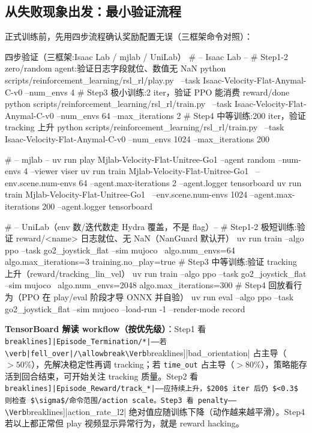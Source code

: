 \subsection{从失败现象出发：最小验证流程}
\label{sec:rlmc-rew-smoke}

正式训练前，先用四步流程确认奖励配置无误（三框架命令对照）：

\begin{codebox}[bash]{四步验证（三框架:Isaac Lab / mjlab / UniLab）}
# -- Isaac Lab --
# Step1-2 zero/random agent:验证日志字段就位、数值无 NaN
python scripts/reinforcement_learning/rsl_rl/play.py \
  --task Isaac-Velocity-Flat-Anymal-C-v0 --num_envs 4
# Step3 极小训练:2 iter，验证 PPO 能消费 reward/done
python scripts/reinforcement_learning/rsl_rl/train.py \
  --task Isaac-Velocity-Flat-Anymal-C-v0 --num_envs 64 --max_iterations 2
# Step4 中等训练:200 iter，验证 tracking 上升
python scripts/reinforcement_learning/rsl_rl/train.py \
  --task Isaac-Velocity-Flat-Anymal-C-v0 --num_envs 1024 --max_iterations 200

# -- mjlab --
uv run play Mjlab-Velocity-Flat-Unitree-Go1 --agent random --num-envs 4 --viewer viser
uv run train Mjlab-Velocity-Flat-Unitree-Go1 \
  --env.scene.num-envs 64 --agent.max-iterations 2 --agent.logger tensorboard
uv run train Mjlab-Velocity-Flat-Unitree-Go1 \
  --env.scene.num-envs 1024 --agent.max-iterations 200 --agent.logger tensorboard

# -- UniLab（env 数/迭代数走 Hydra 覆盖，不是 flag）--
# Step1-2 极短训练:验证 reward/<name> 日志就位、无 NaN（NanGuard 默认开）
uv run train --algo ppo --task go2_joystick_flat --sim mujoco \
  algo.num_envs=64 algo.max_iterations=3 training.no_play=true
# Step3 中等训练:验证 tracking 上升（reward/tracking_lin_vel）
uv run train --algo ppo --task go2_joystick_flat --sim mujoco \
  algo.num_envs=2048 algo.max_iterations=300
# Step4 回放看行为（PPO 在 play/eval 阶段才导 ONNX 并自验）
uv run eval --algo ppo --task go2_joystick_flat --sim mujoco --load-run -1 --render-mode record
\end{codebox}

\textbf{TensorBoard 解读 workflow（按优先级）}：Step1 看 \Verb[breaklines]|Episode_Termination/*|——若 \verb|fell_over|/\allowbreak\Verb[breaklines]|bad_orientation| 占主导（$>50\%$），先解决稳定性再调 tracking；若 \verb|time_out| 占主导（$>80\%$），策略能存活到回合结束，可开始关注 tracking 质量。Step2 看 \Verb[breaklines]|Episode_Reward/track_*|——应持续上升，$200$ iter 后仍 $<0.3$ 则检查 $\sigma$/命令范围/action scale。Step3 看 penalty——\Verb[breaklines]|action_rate_l2| 绝对值应随训练下降（动作越来越平滑）。Step4 若以上都正常但 play 视频显示异常行为，就是 reward hacking。

